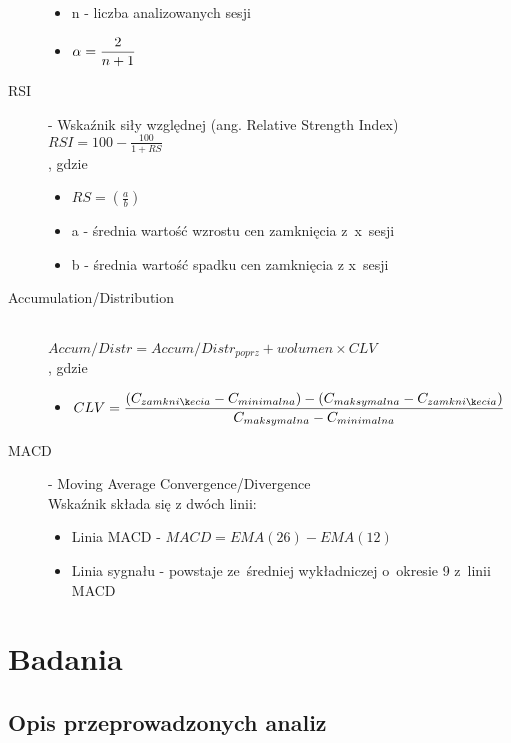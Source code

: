 \begin{description}
\begin{itemize}
				\item n - liczba analizowanych sesji
				\item $\displaystyle \alpha={2\over{n+1}}$
			\end{itemize}
	\item[RSI] - Wskaźnik siły względnej (ang. Relative Strength Index) \hfill \\
		$\displaystyle RSI = 100 - \frac{100}{1+RS}$ \\
		, gdzie \hfill
			\begin{itemize}
				\item $\displaystyle RS = \left( \frac {a}{b} \right)$
				\item a - średnia wartość wzrostu cen zamknięcia z~x~sesji
				\item b - średnia wartość spadku cen zamknięcia z x~sesji
			\end{itemize}
	\item[Accumulation/Distribution] \hfill \\
		$\displaystyle Accum/Distr = Accum/Distr_{poprz} + wolumen \times CLV$ \\
		, gdzie \hfill
			\begin{itemize}
				\item $\displaystyle CLV = { (C_{zamknięcia} - C_{minimalna}) - (C_{maksymalna} - C_{zamknięcia}) \over C_{maksymalna} - C_{minimalna}}$
			\end{itemize}
	\item[MACD] - Moving Average Convergence/Divergence \hfill \\
		Wskaźnik składa się z dwóch linii:
		\begin{itemize}
			\item Linia MACD - $\displaystyle MACD = EMA(26) - EMA(12)$
			\item Linia sygnału - powstaje ze~średniej wykładniczej o~okresie 9 z~linii MACD
		\end{itemize}
\end{description}

\section{Badania}

\subsection{Opis przeprowadzonych analiz}

